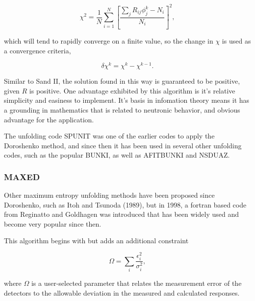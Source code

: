 \begin{equation}\label{eqn:doroshenko-error}
\chi^2 = \frac{1}{N} \sum_{i=1}^N [\frac{\sum_j R_{ij} \phi_j^k - N_i}{N_i}]^2 ,
\end{equation}

which will tend to rapidly converge on a finite value, so the change in $\chi$ is used as a convergence criteria,

\begin{equation}\label{eqn:doroshenko-error-delta}
\delta \chi^k = \chi^k - \chi^{k-1} .
\end{equation}

Similar to Sand II, the solution found in this way is guaranteed to be positive, given $R$ is positive.
One advantage exhibited by this algorithm is it's relative simplicity and easiness to implement.
It's basis in infomation theory means it has a grounding in mathematics that is related to neutronic behavior, and obvious advantage for the application.

The unfolding code SPUNIT was one of the earlier codes to apply the Doroshenko method, and since then it has been used in several other unfolding codes, such as the popular BUNKI, as well as AFITBUNKI and NSDUAZ.




\subsubsection{MAXED}

Other maximum entropy unfolding methods have been proposed since Doroshenko, such as Itoh and Tsunoda (1989), but in 1998, a fortran based code from Reginatto and Goldhagen was introduced that has been widely used and become very popular since then.

This algorithm begins with  but adds an additional constraint

\begin{equation}\label{eqn:maxed-omega}
\Omega = \sum_i \frac{\epsilon_i^2}{\sigma_i^2} ,
\end{equation}

where $\Omega$ is a user-selected parameter that relates the measurement error of the detectors to the allowable deviation in the measured and calculated responses.

